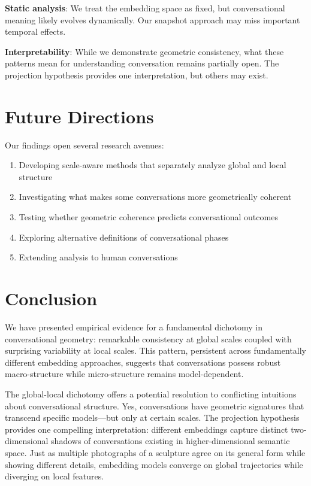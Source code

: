 \documentclass[11pt,letterpaper]{article}
\begin{document}
\textbf{Static analysis}: We treat the embedding space as fixed, but conversational meaning likely evolves dynamically. Our snapshot approach may miss important temporal effects.

\textbf{Interpretability}: While we demonstrate geometric consistency, what these patterns mean for understanding conversation remains partially open. The projection hypothesis provides one interpretation, but others may exist.

\section{Future Directions}

Our findings open several research avenues:

\begin{enumerate}
\item Developing scale-aware methods that separately analyze global and local structure
\item Investigating what makes some conversations more geometrically coherent
\item Testing whether geometric coherence predicts conversational outcomes
\item Exploring alternative definitions of conversational phases
\item Extending analysis to human conversations
\end{enumerate}

\section{Conclusion}

We have presented empirical evidence for a fundamental dichotomy in conversational geometry: remarkable consistency at global scales coupled with surprising variability at local scales. This pattern, persistent across fundamentally different embedding approaches, suggests that conversations possess robust macro-structure while micro-structure remains model-dependent.

The global-local dichotomy offers a potential resolution to conflicting intuitions about conversational structure. Yes, conversations have geometric signatures that transcend specific models—but only at certain scales. The projection hypothesis provides one compelling interpretation: different embeddings capture distinct two-dimensional shadows of conversations existing in higher-dimensional semantic space. Just as multiple photographs of a sculpture agree on its general form while showing different details, embedding models converge on global trajectories while diverging on local features.
\end{document}
